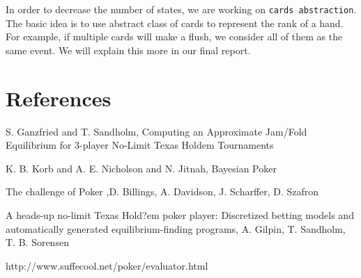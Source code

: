 In order to decrease the number of states, we are working on {\tt cards abstraction}. The basic
idea is to use abstract class of cards to represent the rank of a hand. For example, if multiple cards
will make a flush, we consider all of them as the same event. We will explain this more in our
final report.

\section{References}
\BIT
\item [1] {S. Ganzfried and T. Sandholm}, {Computing an Approximate Jam/Fold Equilibrium for 3-player No-Limit Texas Holdem Tournaments}
\item [2] {K. B. Korb and A. E. Nicholson and N. Jitnah}, {Bayesian Poker}
\item [3] {The challenge of Poker}
,{D. Billings, A. Davidson, J. Scharffer, D. Szafron}
\item [4] {A heads-up no-limit Texas Hold?em poker player: Discretized betting models and automatically generated equilibrium-finding programs}, {A. Gilpin, T. Sandholm, T. B. Sorensen}
\item [5] http://www.suffecool.net/poker/evaluator.html
\EIT